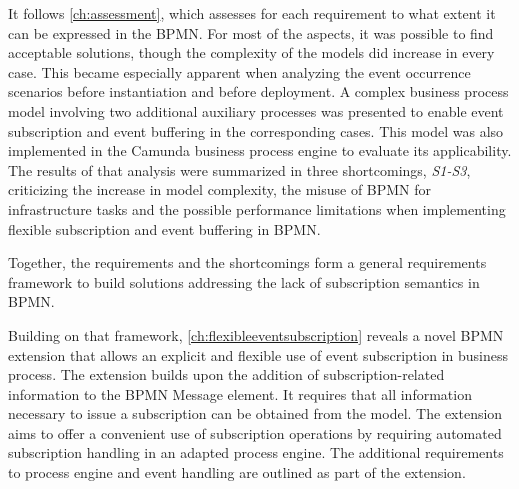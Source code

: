 It follows \autoref{ch:assessment}, which assesses for each requirement to what extent it can be expressed in the BPMN.
For most of the aspects, it was possible to find acceptable solutions, though the complexity of the models did increase in every case.
This became especially apparent when analyzing the event occurrence scenarios before instantiation and before deployment. A complex business process model involving two additional auxiliary processes was presented to enable event subscription and event buffering in the corresponding cases. This model was also implemented in the Camunda business process engine to evaluate its applicability.
The results of that analysis were summarized in three shortcomings, \textit{S1-S3}, criticizing the increase in model complexity, the misuse of BPMN for infrastructure tasks and the possible performance limitations when implementing flexible subscription and event buffering in BPMN.

Together, the requirements and the shortcomings form a general requirements framework to build solutions addressing the lack of subscription semantics in BPMN.


Building on that framework, \autoref{ch:flexibleeventsubscription} reveals a novel BPMN extension that allows an explicit and flexible use of event subscription in business process.
The extension builds upon the addition of subscription-related information to the BPMN Message element. It requires that all information necessary to issue a subscription can be obtained from the model.
The extension aims to offer a convenient use of subscription operations by requiring automated subscription handling in an adapted process engine.
The additional requirements to process engine and event handling are outlined as part of the extension.


